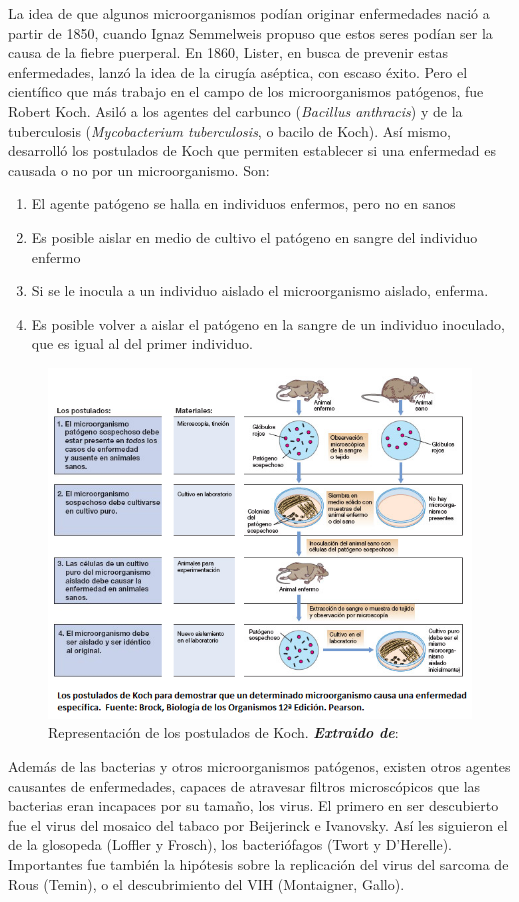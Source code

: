 La idea de que algunos microorganismos podían originar enfermedades nació a partir de 1850, cuando Ignaz Semmelweis propuso que estos seres podían ser la causa de la fiebre puerperal. En 1860, Lister, en busca de prevenir estas enfermedades, lanzó la idea de la cirugía aséptica, con escaso éxito. Pero el científico que más trabajo en el campo de los microorganismos patógenos, fue Robert Koch. Asiló a los agentes del carbunco (\textit{Bacillus anthracis}) y de la tuberculosis (\textit{Mycobacterium tuberculosis}, o bacilo de Koch). Así mismo, desarrolló los postulados de Koch que permiten establecer si una enfermedad es causada o no por un microorganismo. Son:
\begin{enumerate}[itemsep=0pt,parsep=0pt,topsep=0pt,partopsep=0pt]
	\item El agente patógeno se halla en individuos enfermos, pero no en sanos
	\item Es posible aislar en medio de cultivo el patógeno en sangre del individuo enfermo
	\item Si se le inocula a un individuo aislado el microorganismo aislado, enferma.
	\item Es posible volver a aislar el patógeno en la sangre de un individuo inoculado, que es igual al del primer individuo.
\end{enumerate}
\begin{figure}[htbp]
	\centering
	\includegraphics[trim={0 2cm 0 0},clip,width=0.8\columnwidth]{./A.imagenes/ACV-MICROBIO-PostuladosKoch}
	\caption[Postulados de Koch]{Representación de los postulados de Koch. \textit{\textbf{Extraido de}}: \protect\cite{Brock2012}}
\end{figure}

Además de las bacterias y otros microorganismos patógenos, existen otros agentes causantes de enfermedades, capaces de atravesar filtros microscópicos que las bacterias eran incapaces por su tamaño, los virus. El primero en ser descubierto fue el virus del mosaico del tabaco por Beijerinck e Ivanovsky. Así les siguieron el de la glosopeda (Loffler y Frosch), los bacteriófagos (Twort y D'Herelle). Importantes fue también la hipótesis sobre la replicación del virus del sarcoma de Rous (Temin), o el descubrimiento del VIH (Montaigner, Gallo).


